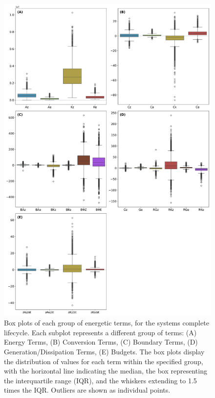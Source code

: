 \begin{figure}[!htbp]
\centering
\includegraphics[width=\textwidth]{figs_5/box_plot_Total_all_groups.png}
\caption[Box plots - Complete Lifecycle]{Box plots of each group of energetic terms, for the systems complete lifecycle. Each subplot represents a different group of terms: (A) Energy Terms, (B) Conversion Terms, (C) Boundary Terms, (D) Generation/Dissipation Terms, (E) Budgets. The box plots display the distribution of values for each term within the specified group, with the horizontal line indicating the median, the box representing the interquartile range (IQR), and the whiskers extending to 1.5 times the IQR. Outliers are shown as individual points.}
\label{fig:boxplot_energy_total}
\end{figure}

